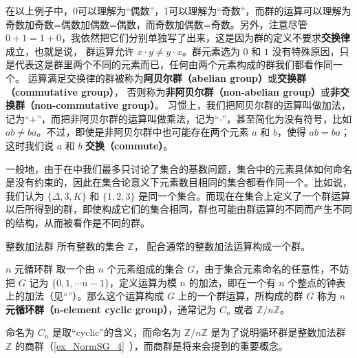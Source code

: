 在以上例子中，0可以理解为“偶数”，1可以理解为“奇数”，而群的运算可以理解为奇数加奇数=偶数加偶数=偶数，而奇数加偶数=奇数。另外，注意尽管 $0+1=1+0$，我依然把它们分别单独写了出来，这是因为群的定义不要求\textbf{交换律}成立，也就是说， 群运算允许 $x\cdot y\neq y\cdot x$。群元素选为 $0$ 和 $1$ 没有特殊原因，只是代表这是群里两个不同的元素而已，任何由两个元素构成的群我们都看作同一个。 运算满足交换律的群被称为\textbf{阿贝尔群（abelian group）}或\textbf{交换群（commutative group）}， 否则称为\textbf{非阿贝尔群（non-abelian group）}或\textbf{非交换群（non-commutative group）}。 习惯上，我们把阿贝尔群的运算叫做加法，记为“$+$”，而把非阿贝尔群的运算叫做乘法，记为“$\cdot$”，甚至简化为没有符号，比如 $ab\not= ba$。不过，即使是非阿贝尔群中也可能存在两个元素 $a$ 和 $b$，使得 $ab=ba$；这时我们说 $a$ 和 $b$ \textbf{交换（commute）}。

一般地，由于在中我们最多只讨论了集合的基数问题，集合中的元素具体如何命名是没有约束的，因此在集合论意义下元素数目相同的集合都看作同一个。比如说，我们认为 $\{\Delta,3, K\}$ 和 $\{1,2,3\}
$ 是同一个集合。而现在在集合上定义了一个群运算以后所得到的群，即使构成它们的集合相同，群也可能由群运算的不同而产生不同的结构，从而被看作是不同的群。

\begin{example}{整数加法群}\label{ex_Group_1}
所有整数的集合 $\mathbb Z$， 配合通常的整数加法运算构成一个群。
\end{example}

\begin{example}{$n$ 元循环群}\label{ex_Group_2}
取一个由 $n$ 个元素组成的集合 $G$，由于集合元素命名的任意性，不妨把 $G$ 记为 $\{0, 1, \cdots n-1\}$，定义运算为模 $n$ 的加法，即在一个有 $n$ 个整点的钟表上的加法（见“”）。那么这个运算构成 $G$ 上的一个群运算，所构成的群 $G$ 称为 \textbf{$n$ 元\textbf{循环群（n-element cyclic group）}}，通常记为 $C_n$ 或者 $\mathbb{Z}/n\mathbb{Z}$。

命名为 $C_n$ 是取“cyclic”的含义，而命名为 $\mathbb{Z}/n\mathbb{Z}$ 是为了说明循环群是整数加法群 $\mathbb{Z}$ 的商群（\autoref{ex_NormSG_4}~），而商群是将来会提到的重要概念。
\end{example}


